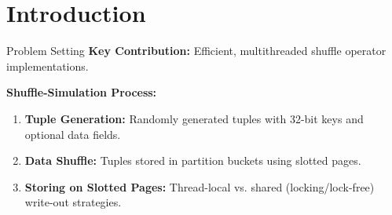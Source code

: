 










\section{Introduction}
\begin{frame}{Problem Setting}
  \textbf{Key Contribution:}
  Efficient, multithreaded shuffle operator implementations.

  \textbf{Shuffle-Simulation Process:}
  \begin{enumerate}
    \item \textbf{Tuple Generation:}
          Randomly generated tuples with 32-bit keys and optional data fields.
    \item \textbf{Data Shuffle:}
          Tuples stored in partition buckets using slotted pages.
    \item \textbf{Storing on Slotted Pages:}
          Thread-local vs.
          shared (locking/lock-free) write-out strategies.
  \end{enumerate}
\end{frame}

